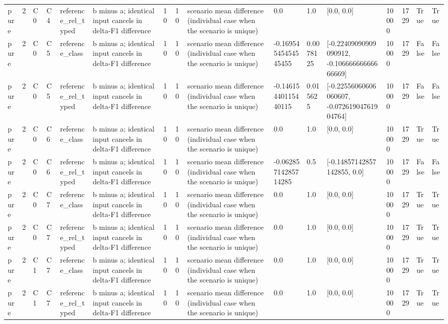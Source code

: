 \begin{tabular}{llllllllllllllll}
pure & 2 & C0 & C4 & reference\_rel\_typed & b minus a; identical input cancels in delta-F1 difference & 10 & 10 & scenario mean difference (individual case when the scenario is unique) & 0.0 & 1.0 & [0.0, 0.0] & 10000 & 1729 & True & True \\
pure & 2 & C0 & C5 & reference\_class & b minus a; identical input cancels in delta-F1 difference & 10 & 10 & scenario mean difference (individual case when the scenario is unique) & -0.16954545454545455 & 0.0078125 & [-0.22409090909090912, -0.10666666666666669] & 10000 & 1729 & False & False \\
pure & 2 & C0 & C5 & reference\_rel\_typed & b minus a; identical input cancels in delta-F1 difference & 10 & 10 & scenario mean difference (individual case when the scenario is unique) & -0.14615440115440115 & 0.015625 & [-0.22556060606060607, -0.07261904761904764] & 10000 & 1729 & False & False \\
pure & 2 & C0 & C6 & reference\_class & b minus a; identical input cancels in delta-F1 difference & 10 & 10 & scenario mean difference (individual case when the scenario is unique) & 0.0 & 1.0 & [0.0, 0.0] & 10000 & 1729 & True & True \\
pure & 2 & C0 & C6 & reference\_rel\_typed & b minus a; identical input cancels in delta-F1 difference & 10 & 10 & scenario mean difference (individual case when the scenario is unique) & -0.06285714285714285 & 0.5 & [-0.14857142857142855, 0.0] & 10000 & 1729 & False & False \\
pure & 2 & C0 & C7 & reference\_class & b minus a; identical input cancels in delta-F1 difference & 10 & 10 & scenario mean difference (individual case when the scenario is unique) & 0.0 & 1.0 & [0.0, 0.0] & 10000 & 1729 & True & True \\
pure & 2 & C0 & C7 & reference\_rel\_typed & b minus a; identical input cancels in delta-F1 difference & 10 & 10 & scenario mean difference (individual case when the scenario is unique) & 0.0 & 1.0 & [0.0, 0.0] & 10000 & 1729 & True & True \\
pure & 2 & C1 & C7 & reference\_class & b minus a; identical input cancels in delta-F1 difference & 10 & 10 & scenario mean difference (individual case when the scenario is unique) & 0.0 & 1.0 & [0.0, 0.0] & 10000 & 1729 & True & True \\
pure & 2 & C1 & C7 & reference\_rel\_typed & b minus a; identical input cancels in delta-F1 difference & 10 & 10 & scenario mean difference (individual case when the scenario is unique) & 0.0 & 1.0 & [0.0, 0.0] & 10000 & 1729 & True & True \\

\end{tabular}
